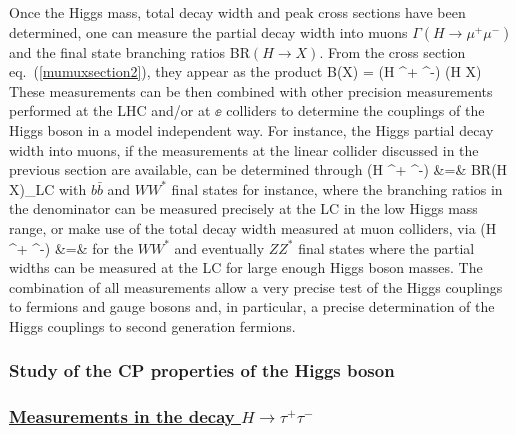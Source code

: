 Once the Higgs mass, total decay width and peak cross sections have been
determined, one can measure the partial decay width  into muons $\Gamma
(H\to \mu^+ \mu^-)$ and the final state branching ratios BR$(H \to X)$.  From
the cross section eq.~(\ref{mumuxsection2}), they appear
as the product
\beq
B(X) = \Gamma(H \to \mu^+ \mu^-) (H \to X)
\eeq
These measurements can be then combined with other precision measurements
performed at the LHC and/or at $\ee$ colliders to determine the couplings of
the Higgs boson in a model independent way. For instance, the Higgs partial
decay width into muons, if the measurements at the linear collider 
discussed in the previous section  are available, can be determined through
\cite{mu-Rev2}
\beq
\Gamma (H \to \mu^+ \mu^-) &=&  { {\rm BR}(H \to X)_{\rm LC} }
\eeq
with $b\bar{b}$ and $WW^*$ final states for instance, where the branching
ratios in the denominator can be measured precisely at the LC in the low Higgs
mass range,  or make use of the total decay width measured at muon colliders,
via
\beq
\Gamma (H \to \mu^+ \mu^-) &=& 
\eeq
for the $WW^*$ and eventually $ZZ^*$ final states where the partial widths can 
be measured at the LC for large enough Higgs boson masses. The combination of 
all measurements allow a very precise test of the Higgs couplings to fermions 
and gauge bosons and, in particular, a precise determination of the Higgs 
couplings to second generation fermions. 

\subsubsection{Study of the CP properties of the Higgs boson}

\subsubsection*{\underline{Measurements in the decay $H \to \tau^+ \tau^-$}}

